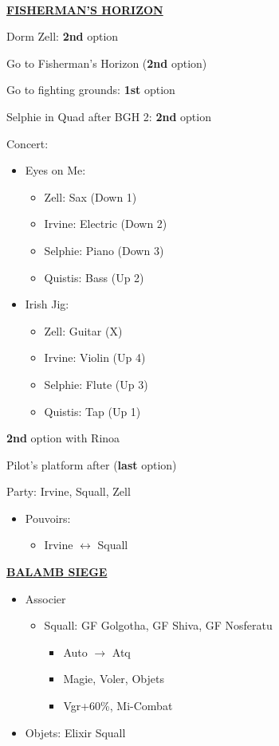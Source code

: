 \leavevmode\\
\underline{\textbf{FISHERMAN'S HORIZON}}

Dorm Zell: \textbf{2nd} option

Go to Fisherman's Horizon (\textbf{2nd} option)

Go to fighting grounds: \textbf{1st} option

Selphie in Quad after BGH 2: \textbf{2nd} option

Concert:
\begin{itemize}
	\item Eyes on Me:
		\begin{itemize}
			\item Zell: Sax (Down 1)
			\item Irvine: Electric (Down 2)
			\item Selphie: Piano (Down 3)
			\item Quistis: Bass (Up 2)
		\end{itemize}
	\item Irish Jig:
		\begin{itemize}
			\item Zell: Guitar (X)
			\item Irvine: Violin (Up 4)
			\item Selphie: Flute (Up 3)
			\item Quistis: Tap (Up 1)
		\end{itemize}
\end{itemize}

\textbf{2nd} option with Rinoa

Pilot's platform after (\textbf{last} option)

Party: Irvine, Squall, Zell
\begin{itemize}
	\item Pouvoirs:
		\begin{itemize}
			\item Irvine $\leftrightarrow$ Squall
		\end{itemize}
\end{itemize}

\newpage
\underline{\textbf{BALAMB SIEGE}}

\begin{menu}
	\begin{itemize}
		\item Associer
			\begin{itemize}
				\item Squall: GF Golgotha, GF Shiva, GF Nosferatu
					\begin{itemize}
						\item Auto $\rightarrow$ Atq
						\item Magie, Voler, Objets
						\item Vgr+60\%, Mi-Combat
					\end{itemize}
			\end{itemize}
		\item Objets: Elixir Squall
	\end{itemize}
\end{menu}

